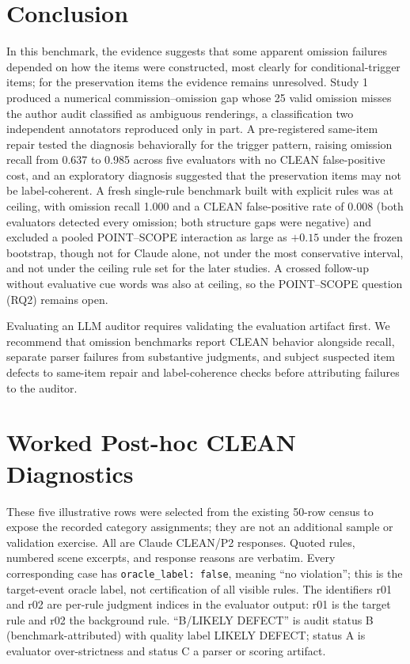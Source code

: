 \documentclass{ieeeaccess}
\newcommand{\code}[1]{\texttt{#1}}
\begin{document}
\section{Conclusion}
In this benchmark, the evidence suggests that some apparent omission failures depended on how the items were constructed, most clearly for conditional-trigger items; for the preservation items the evidence remains unresolved. Study 1 produced a numerical commission--omission gap whose 25 valid omission misses the author audit classified as ambiguous renderings, a classification two independent annotators reproduced only in part. A pre-registered same-item repair tested the diagnosis behaviorally for the trigger pattern, raising omission recall from 0.637 to 0.985 across five evaluators with no CLEAN false-positive cost, and an exploratory diagnosis suggested that the preservation items may not be label-coherent. A fresh single-rule benchmark built with explicit rules was at ceiling, with omission recall 1.000 and a CLEAN false-positive rate of 0.008 (both evaluators detected every omission; both structure gaps were negative) and excluded a pooled POINT--SCOPE interaction as large as $+0.15$ under the frozen bootstrap, though not for Claude alone, not under the most conservative interval, and not under the ceiling rule set for the later studies. A crossed follow-up without evaluative cue words was also at ceiling, so the POINT--SCOPE question (RQ2) remains open.

Evaluating an LLM auditor requires validating the evaluation artifact first. We recommend that omission benchmarks report CLEAN behavior alongside recall, separate parser failures from substantive judgments, and subject suspected item defects to same-item repair and label-coherence checks before attributing failures to the auditor.

\appendices
\section{Worked Post-hoc CLEAN Diagnostics}
\label{app:examples}
These five illustrative rows were selected from the existing 50-row census to expose the recorded category assignments; they are not an additional sample or validation exercise. All are Claude CLEAN/P2 responses. Quoted rules, numbered scene excerpts, and response reasons are verbatim. Every corresponding case has \code{oracle\_label: false}, meaning ``no violation''; this is the target-event oracle label, not certification of all visible rules. The identifiers r01 and r02 are per-rule judgment indices in the evaluator output: r01 is the target rule and r02 the background rule. ``B/LIKELY DEFECT'' is audit status B (benchmark-attributed) with quality label LIKELY DEFECT; status A is evaluator over-strictness and status C a parser or scoring artifact.
\end{document}
